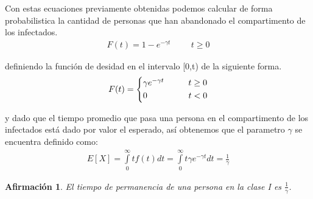 \documentclass[a4paper,openany,12pt]{book}
\newtheorem{Af}{Afirmación}
\begin{document}
Con estas ecuaciones previamente obtenidas podemos calcular de forma probabilistica la cantidad de personas que han abandonado el compartimento de los infectados.
\begin{align}
F(t) = 1 -  e^{-\gamma t} \hspace{1cm} t \geq  0
\end{align}

definiendo la función de desidad en el intervalo [0,t) de la siguiente forma.\\
\begin{equation*}
F(t) =
\begin{cases*}
\gamma e^{-\gamma t} \hspace{1cm} t \geq  0 \\
0 \hspace{1.7cm} t <  0
\end{cases*}
\end{equation*}

y dado que el tiempo promedio que pasa una persona en el compartimento de los infectados está dado por valor el esperado, así obtenemos que el parametro $\gamma$ se encuentra definido como: \\

\begin{align}
E[X] = \int \limits_{0}^{\infty} tf(t)dt = \int \limits_{0}^{\infty} t\gamma e^{-\gamma t} dt = \frac{1}{\gamma}
\end{align}

\begin{Af}
El tiempo de permanencia de una persona en la clase I es $\frac{1}{\gamma}$. \cite{Martcheva}
\end{Af}
\end{document}

